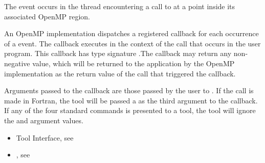 \events

The  event occurs in the thread encountering a call
to  at a point inside its associated OpenMP region.

\tools

An OpenMP implementation dispatches a registered
 callback for each occurrence of a
 event.  The callback executes in the context of the
call that occurs in the user program.  This callback has type
signature .The callback may return
any non-negative value, which will be returned to the application by
the OpenMP implementation as the return value of the
 call that triggered the callback.


Arguments passed to the callback are those passed by the user to
. If the call is made in Fortran, the tool
will be passed a  as the third argument to the callback. If
any of the four standard commands is presented to a tool, the tool
will ignore the  and  argument values.



\crossreferences
\begin{itemize}
\item Tool Interface, see
\item {}, see 
\end{itemize}

